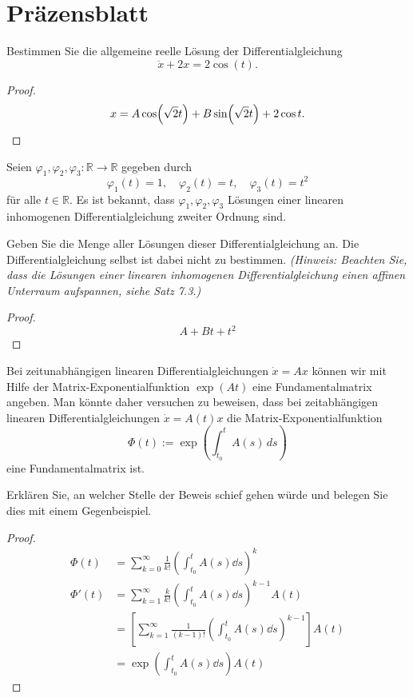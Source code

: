 	\section*{Präzensblatt}
	\begin{Problem}
		Bestimmen Sie die allgemeine reelle Lösung der Differentialgleichung
		\[
		\ddot{x} + 2x = 2\cos(t).
		\]
		\end{Problem}
	\begin{proof}
		\[
		x = A \cos(\sqrt{2} t) + B\sin (\sqrt{2} t)+2 \cos t
		.\qedhere\] 
	\end{proof}	
		\begin{Problem}
			Seien $\varphi_1, \varphi_2, \varphi_3 : \mathbb{R} \to \mathbb{R}$ gegeben durch
			\[
			\varphi_1(t) = 1, \quad \varphi_2(t) = t, \quad \varphi_3(t) = t^2
			\]
			für alle $t \in \mathbb{R}$. Es ist bekannt, dass $\varphi_1, \varphi_2, \varphi_3$ Lösungen einer linearen inhomogenen Differentialgleichung zweiter Ordnung sind.
			
			Geben Sie die Menge aller Lösungen dieser Differentialgleichung an. Die Differentialgleichung selbst ist dabei nicht zu bestimmen.  
			\textit{(Hinweis: Beachten Sie, dass die Lösungen einer linearen inhomogenen Differentialgleichung einen affinen Unterraum aufspannen, siehe Satz 7.3.)}
		\end{Problem}
	\begin{proof}
		\[A+ B t + t^2\]
	\end{proof}	
		\begin{Problem}
			Bei zeitunabhängigen linearen Differentialgleichungen $\dot{x} = Ax$ können wir mit Hilfe der Matrix-Exponentialfunktion $\exp(At)$ eine Fundamentalmatrix angeben. Man könnte daher versuchen zu beweisen, dass bei zeitabhängigen linearen Differentialgleichungen $\dot{x} = A(t)x$ die Matrix-Exponentialfunktion
			\[
			\Phi(t) := \exp\left( \int_{t_0}^t A(s) \, ds \right)
			\]
			eine Fundamentalmatrix ist.
			
			Erklären Sie, an welcher Stelle der Beweis schief gehen würde und belegen Sie dies mit einem Gegenbeispiel.
		\end{Problem}
		\begin{proof}
			\begin{align*}
				\Phi(t) &= \sum_{k=0}^\infty \frac 1{k!}\left( \int_{t_0}^t A(s)\dd{s} \right)^k\\
				\Phi'(t)&=\sum_{k=1}^\infty \frac{k}{k!}\left( \int_{t_0}^t A(s)\dd{s} \right)^{k-1}A(t)\\
					&= \left[ \sum_{k=1}^\infty \frac{1}{(k-1)!}\left( \int_{t_0}^t A(s)\dd{s} \right)^{k-1} \right]A(t)\\
					&= \exp\left( \int_{t_0}^t A(s)\dd{s} \right) A(t)
			\end{align*}
		\end{proof}
